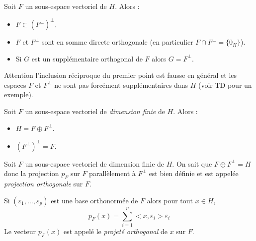 \documentclass[a4paper,10pt]{report}
\begin{document}
\begin{preuve}
\vspace{6cm}
\end{preuve}

\begin{prop} Soit $F$ un sous-espace vectoriel de $H$. Alors :
\begin{itemize}
\item $F \subset (F^{\perp})^{\perp}$.
\item $F$ et $F^{\perp}$ sont en somme directe orthogonale (en particulier $F \cap F^{\perp} = \lbrace 0_H \rbrace$).
\item Si $G$ est un supplémentaire orthogonal de $F$ alors $G= F^{\perp}$.
\end{itemize}
\end{prop}

\begin{preuve}

\vspace{6cm}
\end{preuve}

\begin{rem} Attention l'inclusion réciproque du premier point est fausse en général et les espaces $F$ et $F^{\perp}$ ne sont pas forcément supplémentaires dans $H$ (voir TD pour un exemple).
\end{rem}

\begin{thm}
Soit $F$ un sous-espace vectoriel de \textit{dimension finie} de $H$. Alors :
\begin{itemize}
\item $H = F \oplus F^{\perp}$.
\item $(F^{\perp})^{\perp}=F$.
\end{itemize}
\end{thm}

\begin{preuve}
\vspace{7cm}

\end{preuve}

\phantom{test}

\vspace{5cm}
\begin{thm} Soit $F$ un sous-espace vectoriel de dimension finie de $H$. On sait que $F \oplus F^{\perp}=H$ donc la projection $p_F$ sur $F$ parallèlement à $F^{\perp}$ est bien définie et est appelée \textit{projection orthogonale} sur $F$.

\noindent Si $(\varepsilon_1, \ldots, \varepsilon_p)$ est une base orthonormée de $F$ alors pour tout $x \in H$,
$$ p_F(x) = \sum_{i=1}^p <x, \varepsilon_i> \varepsilon_i $$
Le vecteur $p_F(x)$ est appelé le \textit{projeté orthogonal} de $x$ sur $F$.
\end{thm}
\end{document}
